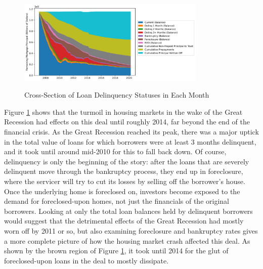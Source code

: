 \documentclass[12pt]{article}
\begin{document}
\begin{figure}[h]
	\centering
	\caption{Cross-Section of Loan Delinquency Statuses in Each Month}
	\includegraphics[width=0.8\textwidth]{../figures/stackplot_delinq_status_with_writeoffs}
	\label{fig:stackplot_delinq_status_with_writeoffs}
\end{figure}

Figure \ref{fig:stackplot_delinq_status_with_writeoffs} shows that the turmoil in housing markets in the wake of the Great Recession had effects on this deal until roughly 2014, far beyond the end of the financial crisis. As the Great Recession reached its peak, there was a major uptick in the total value of loans for which borrowers were at least 3 months delinquent, and it took until around mid-2010 for this to fall back down. Of course, delinquency is only the beginning of the story: after the loans that are severely delinquent move through the bankruptcy process, they end up in foreclosure, where the servicer will try to cut its losses by selling off the borrower’s house. Once the underlying home is foreclosed on, investors become exposed to the demand for foreclosed-upon homes, not just the financials of the original borrowers. Looking at only the total loan balances held by delinquent borrowers would suggest that the detrimental effects of the Great Recession had mostly worn off by 2011 or so, but also examining foreclosure and bankruptcy rates gives a more complete picture of how the housing market crash affected this deal. As shown by the brown region of Figure \ref{fig:stackplot_delinq_status_with_writeoffs}, it took until 2014 for the glut of foreclosed-upon loans in the deal to mostly dissipate.
\end{document}
